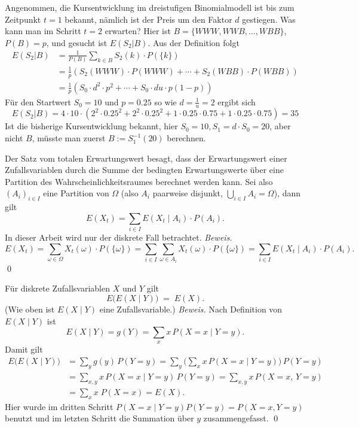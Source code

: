 \begin{bsp}[Rechenbeispiel]
Angenommen, die Kursentwicklung im dreistufigen Binomialmodell ist bis zum 
Zeitpunkt $t=1$ bekannt, nämlich ist der Preis um den Faktor $d$ gestiegen. 
Was kann man im Schritt $t=2$ erwarten? Hier ist $B=\{WWW, WWB, \dots, WBB \}$, $P(B)=p$, und gesucht ist $E(S_2|B)$. Aus der Definition folgt
$$
\begin{aligned}
E(S_2|B) &= \frac{1}{P(B)}\sum_{k \in B} S_2(k) \cdot P(\{ k \}) \\ &=\frac{1}{p}(S_2(WWW) \cdot P(WWW)+ \cdots + S_2(WBB) \cdot P(WBB)) \\
&= \frac{1}{p} (S_0 \cdot d^2 \cdot  p^2 + \cdots + S_0 \cdot d u \cdot p (1-p))
\end{aligned}
$$
Für den Startwert $S_0=10$ und $p=0.25$ so wie $d=\frac{1}{u}=2$ ergibt sich
$$E(S_2|B)=4 \cdot 10 \cdot \left( 2^2 \cdot 0.25^2 + 2^2 \cdot 0.25^2 + 1 \cdot 0.25\cdot 0.75 + 1 \cdot 0.25\cdot 0.75 \right)=35$$
Ist die bisherige Kursentwicklung bekannt, hier $S_0=10, S_1 = d \cdot S_0=20$, aber nicht $B$, müsste man zuerst $B:=S_1^{-1}(20)$ berechnen.
\end{bsp}

\begin{satz}
Der Satz vom totalen Erwartungswert besagt, dass der Erwartungswert einer Zufallsvariablen
durch die Summe der bedingten Erwartungswerte über eine Partition des Wahrscheinlichkeitsraumes
berechnet werden kann. Sei also $(A_i)_{i \in I}$ eine Partition von $\Omega$ (also $A_i$ paarweise disjunkt, $\bigcup_{i \in I} A_i = \Omega$),
dann gilt $$E(X_t) = \sum_{i \in I} E(X_t \mid  A_i) \cdot P(A_i).$$
In dieser Arbeit wird nur der diskrete Fall betrachtet. \textit{Beweis.}
$$E(X_t) = \sum_{\omega \in \Omega} X_t(\omega) \cdot P(\{\omega\}) = \sum_{i \in I} \sum_{\omega \in A_i} X_t(\omega) \cdot P(\{\omega\}) = \sum_{i \in I} E(X_t \mid A_i) \cdot P(A_i).$$
\qed

\end{satz}

\begin{satz}
Für diskrete Zufallsvariablen $X$ und $Y$ gilt
$$
E\big(E(X\mid Y)\big)\;=\;E(X).
$$
(Wie oben ist $E(X\mid Y)$ eine Zufallsvariable.)
\textit{Beweis.} Nach Definition von $E(X\mid Y)$ ist $$E(X\mid Y)=g(Y) =\sum_x x\,P(X=x\mid Y=y).$$ Damit gilt
$$
\begin{aligned}
E\big(E(X\mid Y)\big)
&= \sum_y g(y)\,P(Y=y)
= \sum_y \Big(\sum_x x\,P(X=x\mid Y=y)\Big)\,P(Y=y)\\
&= \sum_{x,y} x\,P(X=x\mid Y=y)\,P(Y=y)
= \sum_{x,y} x\,P(X=x,\,Y=y)\\
&= \sum_x x\;P(X=x)
= E(X).
\end{aligned}
$$
Hier wurde im dritten Schritt $P(X=x\mid Y=y)P(Y=y)=P(X=x, Y=y)$ 
benutzt und im letzten Schritt die Summation über $y$ zusammengefasst. \qed

\end{satz}

